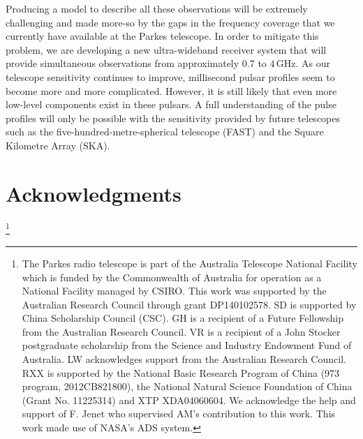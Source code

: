 \documentclass[useAMS,usenatbib]{mn2e}
\begin{document}
Producing a model to describe all these observations will be extremely 
challenging and made more-so by the gaps in the frequency coverage that we 
currently have available at the Parkes telescope.  
%
In order to mitigate this problem, we are developing a new ultra-wideband 
receiver system that will provide simultaneous observations from approximately 
$0.7$ to $4$\,GHz.  
%
As our telescope sensitivity continues to improve, millisecond pulsar profiles seem to 
become more and more complicated. However, it is still likely that even more low-level 
components exist in these pulsars. A full understanding of the pulse profiles will 
only be possible with the sensitivity provided by future telescopes such as the 
five-hundred-metre-spherical telescope (FAST) and the Square Kilometre Array (SKA).


%
\section*{Acknowledgments}
\thanks{
The Parkes radio telescope is part of the Australia Telescope National 
Facility which is funded by the Commonwealth of Australia for operation as a 
National Facility managed by CSIRO. 
%
This work was supported by the Australian Research Council through grant 
DP140102578. SD is supported by China Scholarship Council
(CSC). GH is a recipient of a Future Fellowship from the Australian Research 
Council. VR is a recipient of a John Stocker postgraduate scholarship from the
Science and Industry Endowment Fund of Australia. LW acknowledges support from 
the Australian Research Council. RXX is supported by the National Basic Research 
Program of China (973 program, 2012CB821800), the National Natural Science Foundation 
of China (Grant No. 11225314) and XTP XDA04060604. We acknowledge the help and 
support of F. Jenet who supervised AM's contribution to this work.
This work made use of NASA’s ADS system.
}


\end{document}
